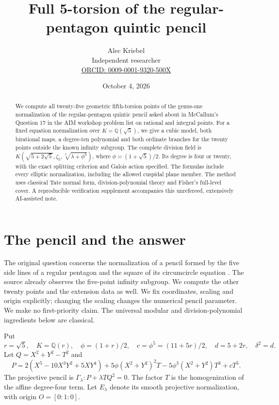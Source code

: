 \documentclass[11pt]{article}
\title{Full 5-torsion of the regular-pentagon quintic pencil}
\author{Alec Kriebel\\\small Independent researcher\\
\small\href{https://orcid.org/0009-0001-9320-500X}{ORCID: 0009-0001-9320-500X}}
\date{October 4, 2026}
\newcommand{\Q}{\mathbb Q}
\begin{document}
\maketitle
\begin{abstract}
We compute all twenty-five geometric fifth-torsion points of the genus-one
normalization of the regular-pentagon quintic pencil asked about in
McCallum's Question 17 in the AIM workshop problem list on rational and
integral points. For a fixed equation normalization over $K=\Q(\sqrt5)$,
we give a cubic model, both birational maps, a degree-ten polynomial and
both ordinate branches for the twenty points outside the known infinity
subgroup. The complete division field is
$K(\sqrt{5+2\sqrt5},\zeta_5,\sqrt[5]{\lambda+\phi^5})$,
where $\phi=(1+\sqrt5)/2$. Its degree is four or twenty, with the exact
splitting criterion and Galois action specified. The formulas include
every elliptic normalization, including the allowed cuspidal plane
member. The method uses classical Tate normal form, division-polynomial
theory and Fisher's full-level cover. A reproducible verification
supplement accompanies this unrefereed, extensively AI-assisted note.
\end{abstract}

\section{The pencil and the answer}
The original question concerns the normalization of a pencil formed by
the five side lines of a regular pentagon and the square of its
circumcircle equation \cite[Question 17, p.~51]{aim}. The source already
observes the five-point infinity subgroup. We compute the other twenty
points and the extension data as well. We fix coordinates, scaling and
origin explicitly; changing the scaling changes the numerical pencil
parameter. We make no first-priority claim. The universal modular and
division-polynomial ingredients below are classical.

Put
\[
r=\sqrt5,\quad K=\Q(r),\quad \phi=(1+r)/2,\quad
c=\phi^5=(11+5r)/2,\quad d=5+2r,\quad \delta^2=d.
\]
Let $Q=X^2+Y^2-T^2$ and
\begin{equation}\label{pentagon}
P=2(X^5-10X^3Y^2+5XY^4)+5\phi(X^2+Y^2)^2T
 -5\phi^3(X^2+Y^2)T^3+cT^5.
\end{equation}
The projective pencil is $\Gamma_\lambda:P+\lambda TQ^2=0$.
The factor $T$ is the homogenization of the affine degree-four term.
Let $E_\lambda$ denote its smooth projective normalization, with origin
$O=[0:1:0]$.
\end{document}
